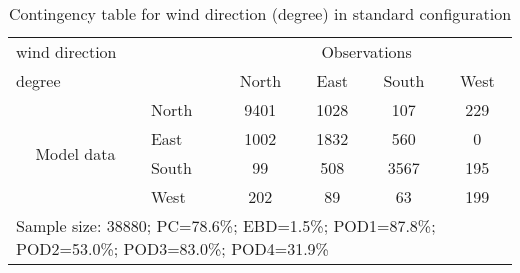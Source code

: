\documentclass[11pt,english]{article}
\begin{document}
\begin{table}[]
\begin{center}
\begin{tabular}{llcccc}
\hline
{wind direction}                                       &                             &    \multicolumn{4}{c}{Observations}                 \\
{degree}                                       &                             & {North}   & {East} & {South} & {West} \\
\hline
\multicolumn{1}{c}{\multirow{4}{*}{Model data}}  & {North}                    & 9401   & 1028    & 107     & 229\\
                                                 & {East}                     & 1002   & 1832    & 560     & 0\\
                                                 & {South}                    & 99   & 508   & 3567    & 195\\
                                                 & {West}                     & 202  & 89   & 63    & 199\\
\hline 
\multicolumn{6}{l}{Sample size: 38880; PC=78.6\%; EBD=1.5\%; POD1=87.8\%; POD2=53.0\%; POD3=83.0\%; POD4=31.9\%}                 \\
\end{tabular}
\end{center}
\caption{Contingency table for {wind direction} (degree) in standard configuration}
\label{tab:contingencywdBEF}
\end{table}
\end{document}
